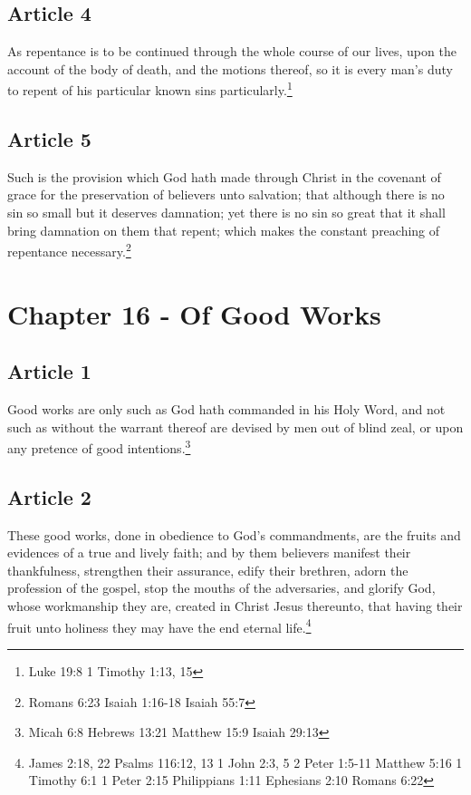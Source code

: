 \documentclass[12pt,letterpaper]{book}
\begin{document}
\section{Article 4}

As repentance is to be continued through the whole course of our lives, upon the account of the body of death, and the motions thereof, so it is every man's duty to repent of his particular known sins particularly.\footnote{Luke 19:8 1 Timothy 1:13, 15}

\section{Article 5}

Such is the provision which God hath made through Christ in the covenant of grace for the preservation of believers unto salvation; that although there is no sin so small but it deserves damnation; yet there is no sin so great that it shall bring damnation on them that repent; which makes the constant preaching of repentance necessary.\footnote{Romans 6:23 Isaiah 1:16-18 Isaiah 55:7}

\chapter{Chapter 16 - Of Good Works}
\section{Article 1}

Good works are only such as God hath commanded in his Holy Word, and not such as without the warrant thereof are devised by men out of blind zeal, or upon any pretence of good intentions.\footnote{Micah 6:8 Hebrews 13:21 Matthew 15:9 Isaiah 29:13}

\section{Article 2}

These good works, done in obedience to God's commandments, are the fruits and evidences of a true and lively faith; and by them believers manifest their thankfulness, strengthen their assurance, edify their brethren, adorn the profession of the gospel, stop the mouths of the adversaries, and glorify God, whose workmanship they are, created in Christ Jesus thereunto, that having their fruit unto holiness they may have the end eternal life.\footnote{James 2:18, 22 Psalms 116:12, 13 1 John 2:3, 5 2 Peter 1:5-11 Matthew 5:16 1 Timothy 6:1 1 Peter 2:15 Philippians 1:11 Ephesians 2:10 Romans 6:22}
\end{document}
